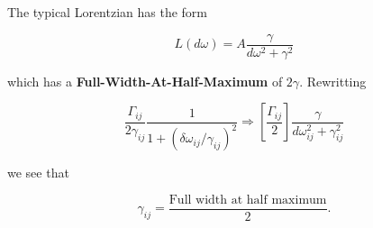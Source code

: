 \begin{framed}\noindent
  The typical Lorentzian has the form

\begin{equation}
  L(d\omega) = A \frac{\gamma}{d\omega^2 + \gamma^2}
\end{equation}

\noindent   which    has   a    \textbf{Full-Width-At-Half-Maximum}   of
$2\gamma$. Rewritting

\begin{equation}
  \frac{\Gamma_{ij}}{2\gamma_{ij}}\frac{1}{1+(\delta\omega_{ij}/\gamma_{ij})^2} \Rightarrow \left[\frac{\Gamma_{ij}}{2}\right] \frac{\gamma}{d\omega_{ij}^2 + \gamma_{ij}^2}
\end{equation}

\noindent we see that

\begin{equation}
  \gamma_{ij} = \frac{\text{Full width at half maximum}}{2}.
\end{equation}

\noindent
\end{framed}

